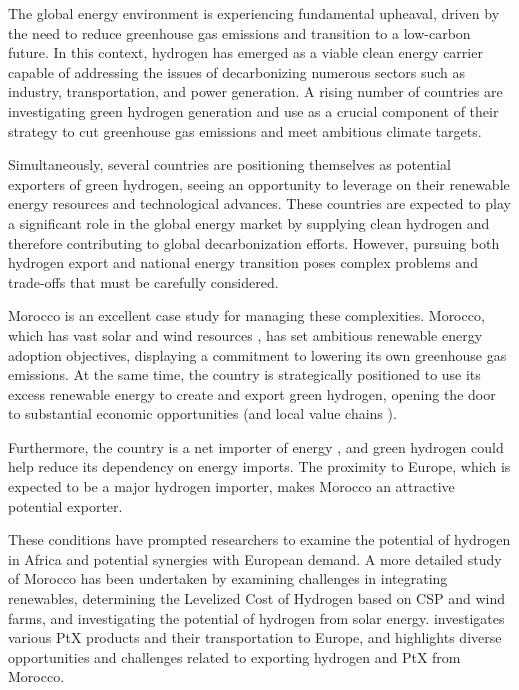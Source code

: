 The global energy environment is experiencing fundamental upheaval, driven by the need to reduce greenhouse gas emissions and transition to a low-carbon future. In this context, hydrogen has emerged as a viable clean energy carrier capable of addressing the issues of decarbonizing numerous sectors such as industry, transportation, and power generation. A rising number of countries are investigating green hydrogen generation and use as a crucial component of their strategy to cut greenhouse gas emissions and meet ambitious climate targets.

Simultaneously, several countries are positioning themselves as potential exporters of green hydrogen, seeing an opportunity to leverage on their renewable energy resources and technological advances. These countries are expected to play a significant role in the global energy market by supplying clean hydrogen and therefore contributing to global decarbonization efforts. However, pursuing both hydrogen export and national energy transition poses complex problems and trade-offs that must be carefully considered.

Morocco is an excellent case study for managing these complexities. Morocco, which has vast solar and wind resources \cite{Peters2023, Touili2018, Sterl2022}, has set ambitious renewable energy adoption objectives, displaying a commitment to lowering its own greenhouse gas emissions. At the same time, the country is strategically positioned to use its excess renewable energy to create and export green hydrogen, opening the door to substantial economic opportunities (and local value chains \cite{Ersoy2022}). %

Furthermore, the country is a net importer of energy \cite{IEA2022}, and green hydrogen could help reduce its dependency on energy imports. The proximity to Europe, which is expected to be a major hydrogen importer, makes Morocco an attractive potential exporter. 

These conditions have prompted researchers \cite{Wijk2021, AbouSeada2022, Zwaan2021, Schellekens2010, Cavana2021, Touili2022, Timmerberg2019, Sens2022} to examine the potential of hydrogen in Africa and potential synergies with European demand. A more detailed study of Morocco has been undertaken by \cite{Boulakhbar2020} examining challenges in integrating renewables, \cite{Khouya2020} determining the Levelized Cost of Hydrogen based on CSP and wind farms, and \cite{Touili2018} investigating the potential of hydrogen from solar energy. \cite{Hampp2021} investigates various PtX products and their transportation to Europe, and \cite{Eichhammer2019} highlights diverse opportunities and challenges related to exporting hydrogen and PtX from Morocco.

